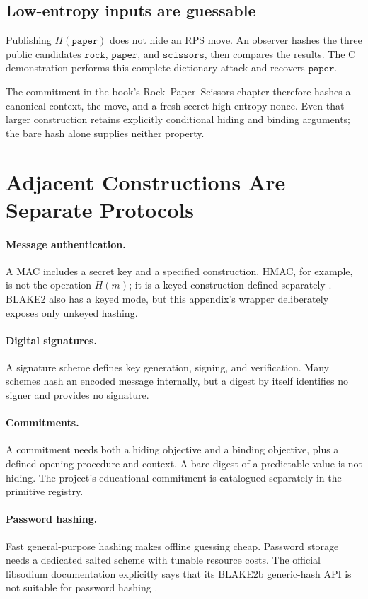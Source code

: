 \subsection{Low-entropy inputs are guessable}

Publishing \(H(\mathtt{paper})\) does not hide an RPS move. An observer hashes
the three public candidates \(\mathtt{rock}\), \(\mathtt{paper}\), and
\(\mathtt{scissors}\), then compares the results. The C demonstration performs
this complete dictionary attack and recovers \(\mathtt{paper}\).

The commitment in the book's Rock--Paper--Scissors chapter therefore hashes a
canonical context, the move, and a fresh secret high-entropy nonce. Even that
larger construction retains explicitly conditional hiding and binding
arguments; the bare hash alone supplies neither property.

\section{Adjacent Constructions Are Separate Protocols}

\paragraph{Message authentication.}
A MAC includes a secret key and a specified construction. HMAC, for example,
is not the operation \(H(m)\); it is a keyed construction defined separately
\cite{rfc2104hmac}. BLAKE2 also has a keyed mode, but this appendix's wrapper
deliberately exposes only unkeyed hashing.

\paragraph{Digital signatures.}
A signature scheme defines key generation, signing, and verification. Many
schemes hash an encoded message internally, but a digest by itself identifies
no signer and provides no signature.

\paragraph{Commitments.}
A commitment needs both a hiding objective and a binding objective, plus a
defined opening procedure and context. A bare digest of a predictable value is
not hiding. The project's educational commitment is catalogued separately in
the primitive registry.

\paragraph{Password hashing.}
Fast general-purpose hashing makes offline guessing cheap. Password storage
needs a dedicated salted scheme with tunable resource costs. The official
libsodium documentation explicitly says that its BLAKE2b generic-hash API is
not suitable for password hashing \cite{libsodium-generichash}.

